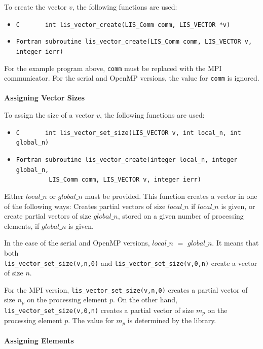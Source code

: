 \documentclass[a4paper]{article}
\begin{document}
To create the vector $v$, the following functions are used: 
\begin{itemize}
\item \verb|C       int lis_vector_create(LIS_Comm comm, LIS_VECTOR *v)|
\item \verb|Fortran subroutine lis_vector_create(LIS_Comm comm, LIS_VECTOR v, integer ierr)|
\end{itemize}
For the example program above, {\tt comm} must be replaced with the MPI communicator. 
For the serial and OpenMP versions, the value for {\tt comm} is ignored.
\\ \\
\noindent
{\bf Assigning Vector Sizes}

To assign the size of a vector $v$, the following functions are used: 
\begin{itemize}
\item \verb|C       int lis_vector_set_size(LIS_VECTOR v, int local_n, int global_n)|
\item \verb|Fortran subroutine lis_vector_create(integer local_n, integer global_n,|\\
      \verb|         LIS_Comm comm, LIS_VECTOR v, integer ierr)|
\end{itemize}
Either $local\_n$ or $global\_n$ must be provided.
This function creates a vector in one of the following ways: 
Creates partial vectors of size $local\_n$ if $local\_n$ is
given, or create partial vectors of size $global\_n$, stored on a given number of processing elements, if $global\_n$ is given. 

In the case of the serial and OpenMP versions, $local\_n$ $=$ $global\_n$. 
It means that both \\
\verb|lis_vector_set_size(v,n,0)| and \verb|lis_vector_set_size(v,0,n)| create a vector of size $n$. 

For the MPI version, \verb|lis_vector_set_size(v,n,0)| 
creates a partial vector of size $n_p$ on the processing element $p$. On the other hand, 
\verb|lis_vector_set_size(v,0,n)| creates a partial vector of size 
$m_p$ on the processing element $p$. The value for $m_p$ is determined by the library. 
\\ \\
\noindent
{\bf Assigning Elements}
\end{document}
